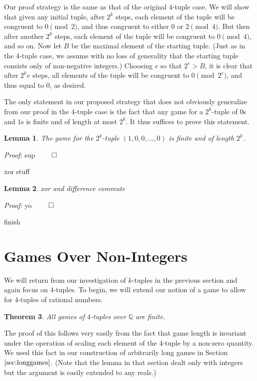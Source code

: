 \documentclass[12pt]{amsart}
\newtheorem{theorem}{Theorem}[section]
\newtheorem{lemma}[theorem]{Lemma}
\begin{document}
Our proof strategy is the same as that of the original $4$-tuple case. We will show that given any initial tuple, after $2^k$ steps, each element of the tuple will be congruent to $0\pmod{2}$, and thus congruent to either $0$ or $2\pmod{4}$. But then after another $2^k$ steps, each element of the tuple will be congruent to $0\pmod{4}$, and so on. Now let $B$ be the maximal element of the starting tuple. (Just as in the $4$-tuple case, we assume with no loss of generality that the starting tuple consists only of non-negative integers.) Choosing $e$ so that $2^e>B$, it is clear that after $2^ke$ steps, all elements of the tuple will be congruent to $0\pmod{2^e}$, and thus equal to $0$, as desired.

The only statement in our proposed strategy that does not obviously generalize from our proof in the $4$-tuple case is the fact that any game for a $2^k$-tuple of $0$s and $1$s is finite and of length at most $2^k$. It thus suffices to prove this statement.

\begin{lemma}
The game for the $2^k$-tuple $(1,0,0,\ldots,0)$ is finite and of length $2^k$.
\end{lemma}

\textit{Proof}: sup $\qed$

xor stuff

\begin{lemma}
xor and difference commute
\end{lemma}

\textit{Proof:} yo $\qed$

finish

\section{Games Over Non-Integers}

We will return from our investigation of $k$-tuples in the previous section and again focus on $4$-tuples. To begin, we will extend our notion of a game to allow for $4$-tuples of rational numbers.

\begin{theorem}
All games of $4$-tuples over $\mathbb{Q}$ are finite.
\end{theorem}

The proof of this follows very easily from the fact that game length is invariant under the operation of scaling each element of the $4$-tuple by a non-zero quantity. We used this fact in our construction of arbitrarily long games in Section $\ref{sec:longgames}$. (Note that the lemma in that section dealt only with integers but the argument is easily extended to any reals.)
\end{document}
